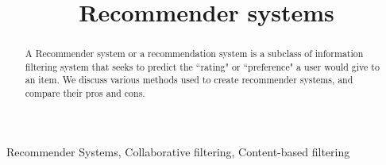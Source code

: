 \documentclass[conference]{IEEEtran}
\begin{document}
\title{Recommender systems}

\author{
\and
{}
}

\maketitle

\begin{abstract}
A Recommender system or a recommendation system is a subclass of information filtering system that seeks to predict the ``rating" or ``preference" a user would give to an item.
We discuss various methods used to create recommender systems, and compare their pros and cons.
\end{abstract}

\begin{IEEEkeywords}
Recommender Systems, Collaborative filtering, Content-based filtering
\end{IEEEkeywords}
\end{document}
